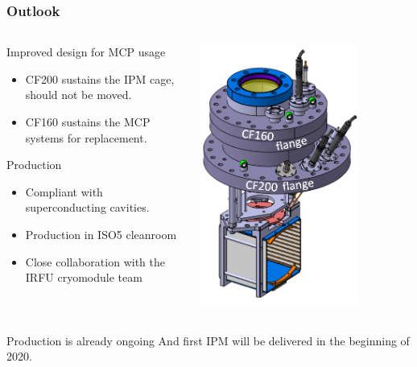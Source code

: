 \begin{frame}[t]
  \frametitle{Outlook}
  \begin{columns}[T]
    \begin{column}{0.45\textwidth}
      \begin{block}{Improved design for MCP usage}
        \begin{itemize}
          \item CF200 sustains the IPM cage, should not be moved.
          \item CF160 sustains the MCP systems for replacement.
        \end{itemize}
      \end{block}
      \begin{block}{Production}
        \begin{itemize}
          \item Compliant with superconducting cavities.
          \item Production in ISO5 cleanroom
          \item Close collaboration with the IRFU cryomodule team
        \end{itemize}
      \end{block}
    \end{column}
    \begin{column}{0.45\textwidth}
      \includegraphics[width=0.75\textwidth]{05_Conclusion/fig/fig000_bride_double2_a}
    \end{column}
  \end{columns}
  \begin{block}{Production is already ongoing}
    And first IPM will be delivered in the beginning of 2020.
  \end{block}
\end{frame}

